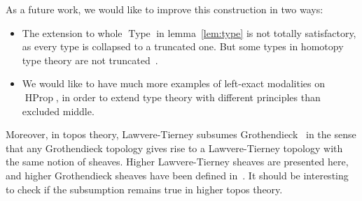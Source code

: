 \documentclass[preprint,9pt,numbers]{sigplanconf}
\newcommand{\eg}{e.g,\xspace}
\DeclareMathOperator{\Type}{Type}
\DeclareMathOperator{\HProp}{HProp}
\begin{document}
As a future work, we would like to improve this construction in two
ways:
\begin{itemize}
\item 
  The extension to whole $\Type$ in lemma~\ref{lem:type} is not
  totally satisfactory, as every type is collapsed to a truncated
  one. But some types in homotopy type theory are not
  truncated~\cite[Example 8.8.6]{hottbook}.
\item 
  We would like to have much more examples of left-exact modalities on
  $\HProp$, in order to extend type theory with different principles
  than excluded middle.
\end{itemize}
Moreover, in topos theory, Lawvere-Tierney subsumes Grothen\-dieck~\cite[Section~V.4]{maclanemoerdijk} in the sense that any
Grothen\-dieck topology gives rise to a Lawvere-Tierney topology with
the same notion of sheaves. Higher Lawvere-Tierney sheaves are
presented here, and higher Grothendieck sheaves have been defined
in~\cite{lurie}. It should be interesting to check if the subsumption
remains true in higher topos theory.







\end{document}
